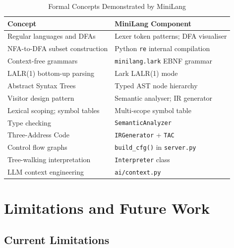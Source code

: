 \documentclass[conference]{IEEEtran}
\begin{document}
\begin{table}[htbp]
\caption{Formal Concepts Demonstrated by MiniLang}
\label{tab:concepts}
\centering
\renewcommand{\arraystretch}{1.2}
\begin{tabular}{@{}p{4.1cm}p{3.7cm}@{}}
\toprule
\textbf{Concept} & \textbf{MiniLang Component} \\
\midrule
Regular languages and DFAs         & Lexer token patterns; DFA visualiser \\
NFA-to-DFA subset construction     & Python \texttt{re} internal compilation \\
Context-free grammars              & \texttt{minilang.lark} EBNF grammar \\
LALR(1) bottom-up parsing          & Lark LALR(1) mode \\
Abstract Syntax Trees              & Typed AST node hierarchy \\
Visitor design pattern             & Semantic analyser; IR generator \\
Lexical scoping; symbol tables     & Multi-scope symbol table \\
Type checking                      & \texttt{SemanticAnalyzer} \\
Three-Address Code                 & \texttt{IRGenerator} + \texttt{TAC} \\
Control flow graphs                & \texttt{build\_cfg()} in \texttt{server.py} \\
Tree-walking interpretation        & \texttt{Interpreter} class \\
LLM context engineering            & \texttt{ai/context.py} \\
\bottomrule
\end{tabular}
\end{table}

\section{Limitations and Future Work}
\label{sec:future}

\subsection{Current Limitations}
\end{document}
